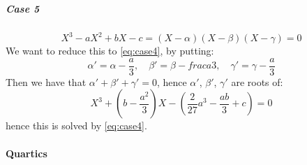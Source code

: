 \subparagraph{Case 5}
\begin{equation} \label{eq:case5}
  X^3-aX^2+bX-c=(X-\alpha)(X-\beta)(X-\gamma) = 0
\end{equation}
We want to reduce this to \eqref{eq:case4}, by putting:
\begin{equation*}
  \alpha'=\alpha-\frac{a}{3}, \quad \beta'=\beta-frac{a}{3}, \quad \gamma'=\gamma-\frac{a}{3}
\end{equation*}
Then we have that $\alpha'+\beta'+\gamma'=0$, hence $\alpha'$, $\beta'$, $\gamma'$ are roots of:
\begin{equation*}
  X^3+\left(b-\frac{a^2}{3}\right)X-\left(\frac{2}{27}a^3-\frac{ab}{3}+c\right)=0
\end{equation*}
hence this is solved by \eqref{eq:case4}.

\paragraph{Quartics}

